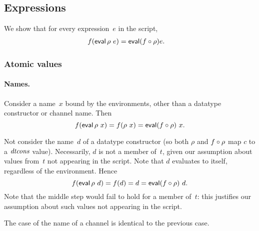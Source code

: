 \subsection{Expressions}

We show that for every expression~$e$ in the script,
\begin{eqnarray*}
f(\mathop{\sf eval} \rho ~ e) & = \mathop{\sf eval} (f \circ \rho) e .
\end{eqnarray*}

\framebox{\ldots}



\subsubsection{Atomic values}

\paragraph{Names.}

Consider a name~$x$ bound by the environments, other than a datatype
constructor or channel name.  Then
\[
f(\mathop{\sf eval} \rho~x) = f(\rho~x) = \mathop{\sf eval} (f\circ\rho)~x.
\]

Not consider the name~$d$ of a datatype constructor (so both $\rho$ and
$f\circ\rho$ map $c$ to a $\mathop{\it dtcons}$ value).  Necessarily, $d$ is not a member
of~$t$, given our assumption about values from~$t$ not appearing in the
script.  Note that $d$ evaluates to itself, regardless of the environment.
Hence
\[
f(\mathop{\sf eval} \rho~d) = f(d) = d = \mathop{\sf eval} (f\circ\rho)~d.
\]
Note that the middle step would fail to hold for a member of~$t$: this
justifies our assumption about such values not appearing in the script. 

The case of the name of a channel is identical to the previous case. 




